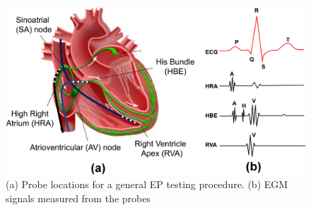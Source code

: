 \begin{figure}[!t]
\centering
		\includegraphics[width=0.9  \textwidth]{figs/probes.png}
		
\caption{\small (a) Probe locations for a general EP testing procedure. (b) EGM signals measured from the probes}
\label{fig:egm}
\end{figure} 

